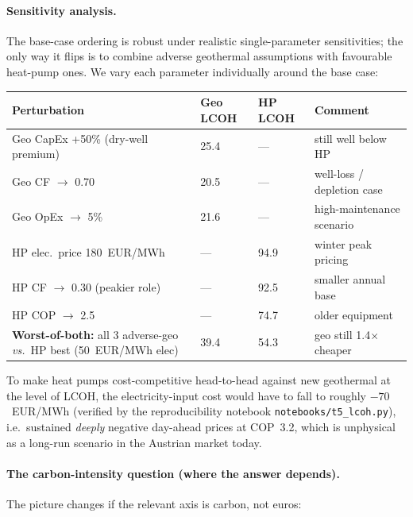 \documentclass{article}
\begin{document}
\paragraph{Sensitivity analysis.} The base-case ordering is robust under
realistic single-parameter sensitivities; the only way it flips is
to combine adverse geothermal assumptions with favourable heat-pump
ones. We vary each parameter individually around the base case:

\begin{center}
\begin{tabular}{llll}
\hline
\textbf{Perturbation} & \textbf{Geo LCOH} & \textbf{HP LCOH} & \textbf{Comment} \\
\hline
Geo CapEx +50\% (dry-well premium)    & 25.4 & ---  & still well below HP \\
Geo CF $\to$ 0.70                     & 20.5 & ---  & well-loss / depletion case \\
Geo OpEx $\to$ 5\%                    & 21.6 & ---  & high-maintenance scenario \\
HP elec.\ price 180~EUR/MWh           & ---  & 94.9 & winter peak pricing \\
HP CF $\to$ 0.30 (peakier role)       & ---  & 92.5 & smaller annual base \\
HP COP $\to$ 2.5                      & ---  & 74.7 & older equipment \\
\textbf{Worst-of-both:} all 3 adverse-geo \emph{vs.}\ HP best (50~EUR/MWh elec) & 39.4 & 54.3 & geo still 1.4$\times$ cheaper \\
\hline
\end{tabular}
\end{center}

To make heat pumps cost-competitive head-to-head against new
geothermal at the level of LCOH, the electricity-input cost
would have to fall to roughly $-70$~EUR/MWh (verified by the
reproducibility notebook \texttt{notebooks/t5\_lcoh.py}), i.e.\
sustained \emph{deeply} negative day-ahead prices at COP~3.2,
which is unphysical as a long-run scenario in the Austrian
market today.

\paragraph{The carbon-intensity question (where the answer depends).}
The picture changes if the relevant axis is carbon, not euros:
\end{document}
